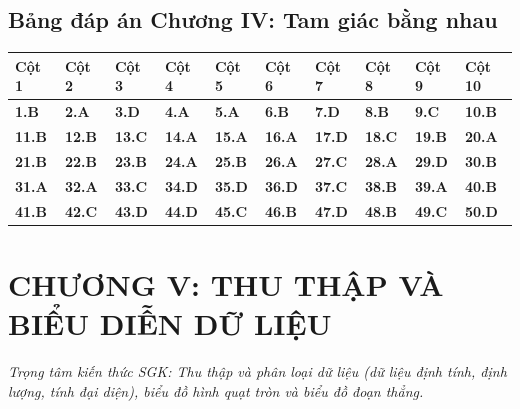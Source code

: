 \documentclass[11pt,a4paper]{article}
\begin{document}
\subsection*{\color{primary} Bảng đáp án Chương IV: Tam giác bằng nhau}
\begin{center}
\renewcommand{\arraystretch}{1.25}
\begin{tabularx}{\textwidth}{*{10}{>{\centering\arraybackslash}X}}
\toprule
\textbf{\color{primary} Cột 1} & \textbf{\color{primary} Cột 2} & \textbf{\color{primary} Cột 3} & \textbf{\color{primary} Cột 4} & \textbf{\color{primary} Cột 5} & \textbf{\color{primary} Cột 6} & \textbf{\color{primary} Cột 7} & \textbf{\color{primary} Cột 8} & \textbf{\color{primary} Cột 9} & \textbf{\color{primary} Cột 10} \\
\midrule
\textbf{1.B} & \textbf{2.A} & \textbf{3.D} & \textbf{4.A} & \textbf{5.A} & \textbf{6.B} & \textbf{7.D} & \textbf{8.B} & \textbf{9.C} & \textbf{10.B} \\
\rowcolor{rowtint} \textbf{11.B} & \textbf{12.B} & \textbf{13.C} & \textbf{14.A} & \textbf{15.A} & \textbf{16.A} & \textbf{17.D} & \textbf{18.C} & \textbf{19.B} & \textbf{20.A} \\
\textbf{21.B} & \textbf{22.B} & \textbf{23.B} & \textbf{24.A} & \textbf{25.B} & \textbf{26.A} & \textbf{27.C} & \textbf{28.A} & \textbf{29.D} & \textbf{30.B} \\
\rowcolor{rowtint} \textbf{31.A} & \textbf{32.A} & \textbf{33.C} & \textbf{34.D} & \textbf{35.D} & \textbf{36.D} & \textbf{37.C} & \textbf{38.B} & \textbf{39.A} & \textbf{40.B} \\
\textbf{41.B} & \textbf{42.C} & \textbf{43.D} & \textbf{44.D} & \textbf{45.C} & \textbf{46.B} & \textbf{47.D} & \textbf{48.B} & \textbf{49.C} & \textbf{50.D} \\
\bottomrule
\end{tabularx}
\end{center}\vspace{10pt}
\section*{\color{primary} CHƯƠNG V: THU THẬP VÀ BIỂU DIỄN DỮ LIỆU}
\textit{Trọng tâm kiến thức SGK: Thu thập và phân loại dữ liệu (dữ liệu định tính, định lượng, tính đại diện), biểu đồ hình quạt tròn và biểu đồ đoạn thẳng.}\par\vspace{4pt}
\end{document}
